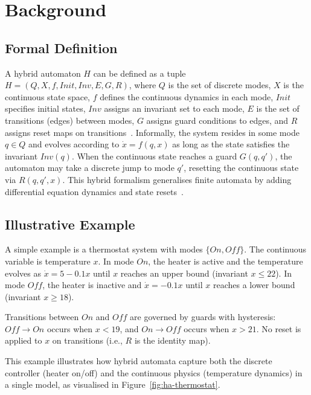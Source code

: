\documentclass[a4paper, 12pt]{report}
\begin{document}
\section{Background}

\subsection*{Formal Definition}

A hybrid automaton $H$ can be defined as a tuple
$H = (Q, X, f, \mathit{Init}, \mathit{Inv}, E, G, R)$,
where $Q$ is the set of discrete modes, $X$ is the continuous state space,
$f$ defines the continuous dynamics in each mode, $\mathit{Init}$ specifies
initial states, $\mathit{Inv}$ assigns an invariant set to each mode, $E$
is the set of transitions (edges) between modes, $G$ assigns guard
conditions to edges, and $R$ assigns reset maps on
transitions~\cite{Henzinger1996}.  Informally, the system resides in some
mode $q \in Q$ and evolves according to $\dot{x} = f(q,x)$ as long as the
state satisfies the invariant $\mathit{Inv}(q)$.  When the continuous state
reaches a guard $G(q,q')$, the automaton may take a discrete jump to mode
$q'$, resetting the continuous state via $R(q,q',x)$.  This hybrid
formalism generalises finite automata by adding differential equation
dynamics and state resets~\cite{Alur1993Hybrid}.

\subsection*{Illustrative Example}

A simple example is a thermostat system with modes $\{On, Off\}$.  The
continuous variable is temperature $x$.  In mode $On$, the heater is active
and the temperature evolves as $\dot{x} = 5 - 0.1x$ until $x$ reaches an
upper bound (invariant $x \le 22$).  In mode $Off$, the heater is inactive
and $\dot{x} = -0.1x$ until $x$ reaches a lower bound (invariant
$x \ge 18$).

Transitions between $On$ and $Off$ are governed by guards with hysteresis:
$Off \to On$ occurs when $x < 19$, and $On \to Off$ occurs when $x > 21$.
No reset is applied to $x$ on transitions (i.e., $R$ is the identity map).

This example illustrates how hybrid automata capture both the discrete
controller (heater on/off) and the continuous physics (temperature dynamics)
in a single model, as visualised in Figure~\ref{fig:ha-thermostat}.
\end{document}
